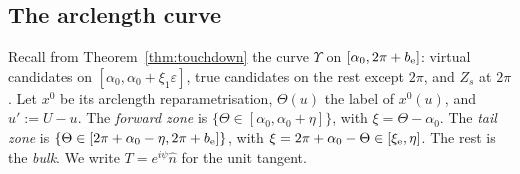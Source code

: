\subsection{The arclength curve}\label{app:B-curve}

Recall from Theorem~\ref{thm:touchdown} the curve $\Upsilon$ on $[\alpha_0,2\pi+b_{\mathrm{e}}]$: virtual candidates on
$[\alpha_0,\alpha_0+\xi_1\varepsilon]$, true candidates on the rest except $2\pi$, and $Z_s$ at $2\pi$. Let $x^0$ be its arclength
reparametrisation, $\Theta(u)$ the label of $x^0(u)$, and $u':=U-u$. The \emph{forward zone} is $\{\Theta\in[\alpha_0,\alpha_0+\eta]\}$,
with $\xi=\Theta-\alpha_0$. The \emph{tail zone} is $\{\Theta\in[2\pi+\alpha_0-\eta,2\pi+b_{\mathrm{e}}]\}$, with $\xi=2\pi+\alpha_0-\Theta\in[\xi_{\mathrm{e}},\eta]$.
The rest is the \emph{bulk}. We write $T=e^{i\psi}\hat n$ for the unit tangent.

